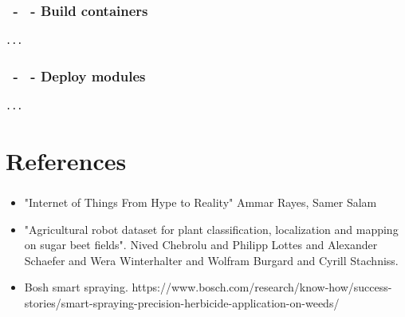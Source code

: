 \documentclass{beamer}
\makeatletter
\newcommand*{\currentname}{\@currentlabelname}
\makeatother
\begin{document}
\begin{frame}[fragile]
\frametitle{\secname\ - \subsecname\ - Build containers}
\begin{lstlisting}[language=HTML]
...
\end{lstlisting}
\end{frame}


\begin{frame}[fragile]
\frametitle{\secname\ - \subsecname\ - Deploy modules}
\begin{lstlisting}[language=HTML]
...
\end{lstlisting}
\end{frame}



\section{References}
\begin{frame}
\frametitle{\currentname}
\begin{itemize}
    \item "Internet of Things From Hype to Reality" Ammar Rayes, Samer Salam
    \item "Agricultural robot dataset for plant classification, localization and mapping on sugar beet fields". Nived Chebrolu and Philipp Lottes and Alexander Schaefer and Wera Winterhalter and Wolfram Burgard and Cyrill Stachniss.
    \item Bosh smart spraying. https://www.bosch.com/research/know-how/success-stories/smart-spraying-precision-herbicide-application-on-weeds/
\end{itemize}
\end{frame}
\end{document}
